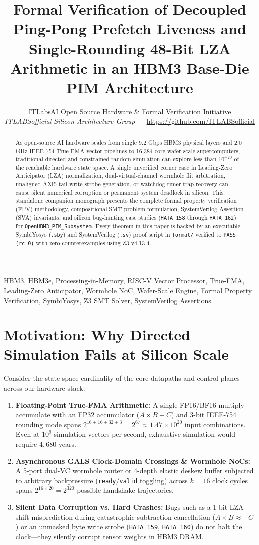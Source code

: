\documentclass[journal,10pt,twocolumn]{IEEEtran}
\title{Formal Verification of Decoupled Ping-Pong Prefetch Liveness and Single-Rounding 48-Bit LZA Arithmetic in an HBM3 Base-Die PIM Architecture}
\author{ITLabsAI Open Source Hardware \& Formal Verification Initiative\\
\textit{ITLABSofficial Silicon Architecture Group} --- \url{https://github.com/ITLABSofficial}}
\begin{document}
\maketitle
\begin{abstract}
As open-source AI hardware scales from single 9.2 Gbps HBM3 physical layers and 2.0 GHz IEEE-754 True-FMA vector pipelines to 16,384-core wafer-scale supercomputers, traditional directed and constrained-random simulation can explore less than $10^{-20}$ of the reachable hardware state space. A single unverified corner case in Leading-Zero Anticipator (LZA) normalization, dual-virtual-channel wormhole flit arbitration, unaligned AXI5 tail write-strobe generation, or watchdog timer trap recovery can cause silent numerical corruption or permanent system deadlock in silicon. This standalone companion monograph presents the complete formal property verification (FPV) methodology, compositional SMT problem formulation, SystemVerilog Assertion (SVA) invariants, and silicon bug-hunting case studies (\texttt{HATA 158} through \texttt{HATA 162}) for \texttt{OpenHBM3\_PIM\_Subsystem}. Every theorem in this paper is backed by an executable SymbiYosys (\texttt{.sby}) and SystemVerilog (\texttt{.sv}) proof script in \texttt{formal/} verified to \texttt{PASS (rc=0)} with zero counterexamples using Z3 v4.13.4.
\end{abstract}
\begin{IEEEkeywords}
HBM3, HBM3e, Processing-in-Memory, RISC-V Vector Processor, True-FMA, Leading-Zero Anticipator, Wormhole NoC, Wafer-Scale Engine, Formal Property Verification, SymbiYosys, Z3 SMT Solver, SystemVerilog Assertions
\end{IEEEkeywords}


\section{Motivation: Why Directed Simulation Fails at Silicon Scale}

Consider the state-space cardinality of the core datapaths and control planes across our hardware stack:
\begin{enumerate}
  \item \textbf{Floating-Point True-FMA Arithmetic:} A single FP16/BF16 multiply-accumulate with an FP32 accumulator ($A \times B + C$) and 3-bit IEEE-754 rounding mode spans $2^{16+16+32+3} = 2^{67} \approx 1.47 \times 10^{20}$ input combinations. Even at $10^9$ simulation vectors per second, exhaustive simulation would require $4,680$ years.
  \item \textbf{Asynchronous GALS Clock-Domain Crossings \& Wormhole NoCs:} A 5-port dual-VC wormhole router or 4-depth elastic deskew buffer subjected to arbitrary backpressure (\texttt{ready}/\texttt{valid} toggling) across $k=16$ clock cycles spans $2^{16 \times 20} = 2^{320}$ possible handshake trajectories.
  \item \textbf{Silent Data Corruption vs. Hard Crashes:} Bugs such as a 1-bit LZA shift misprediction during catastrophic subtraction cancellation ($A \times B \approx -C$) or an unmasked byte write strobe (\texttt{HATA 159}, \texttt{HATA 160}) do not halt the clock—they silently corrupt tensor weights in HBM3 DRAM.
\end{enumerate}
\end{document}
